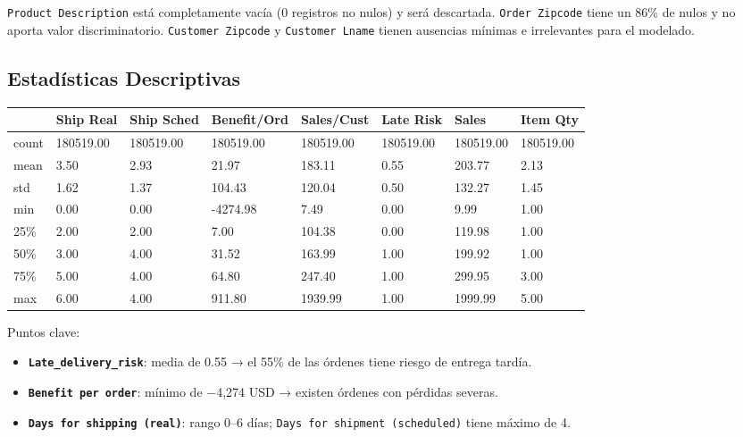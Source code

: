 \documentclass[
  letterpaper,
  DIV=11,
  numbers=noendperiod]{scrartcl}
\newcounter{none} %
\providecommand{\tightlist}{%
  \setlength{\itemsep}{0pt}\setlength{\parskip}{0pt}}
\begin{document}
\texttt{Product\ Description} está completamente vacía (0 registros no
nulos) y será descartada. \texttt{Order\ Zipcode} tiene un 86\% de nulos
y no aporta valor discriminatorio. \texttt{Customer\ Zipcode} y
\texttt{Customer\ Lname} tienen ausencias mínimas e irrelevantes para el
modelado.

\subsection{Estadísticas
Descriptivas}\label{estaduxedsticas-descriptivas}

\protect{}\label{describe}
{\def\LTcaptype{none} %
\begin{longtable}[]{@{}llllllll@{}}
\toprule\noalign{}
& Ship Real & Ship Sched & Benefit/Ord & Sales/Cust & Late Risk & Sales
& Item Qty \\
\midrule\noalign{}
\endhead
\bottomrule\noalign{}
\endlastfoot
count & 180519.00 & 180519.00 & 180519.00 & 180519.00 & 180519.00 &
180519.00 & 180519.00 \\
mean & 3.50 & 2.93 & 21.97 & 183.11 & 0.55 & 203.77 & 2.13 \\
std & 1.62 & 1.37 & 104.43 & 120.04 & 0.50 & 132.27 & 1.45 \\
min & 0.00 & 0.00 & -4274.98 & 7.49 & 0.00 & 9.99 & 1.00 \\
25\% & 2.00 & 2.00 & 7.00 & 104.38 & 0.00 & 119.98 & 1.00 \\
50\% & 3.00 & 4.00 & 31.52 & 163.99 & 1.00 & 199.92 & 1.00 \\
75\% & 5.00 & 4.00 & 64.80 & 247.40 & 1.00 & 299.95 & 3.00 \\
max & 6.00 & 4.00 & 911.80 & 1939.99 & 1.00 & 1999.99 & 5.00 \\
\end{longtable}
}

Puntos clave:

\begin{itemize}
\tightlist
\item
  \textbf{\texttt{Late\_delivery\_risk}}: media de 0.55 → el 55\% de las
  órdenes tiene riesgo de entrega tardía.
\item
  \textbf{\texttt{Benefit\ per\ order}}: mínimo de −4,274 USD → existen
  órdenes con pérdidas severas.
\item
  \textbf{\texttt{Days\ for\ shipping\ (real)}}: rango 0--6 días;
  \texttt{Days\ for\ shipment\ (scheduled)} tiene máximo de 4.
\end{itemize}
\end{document}
